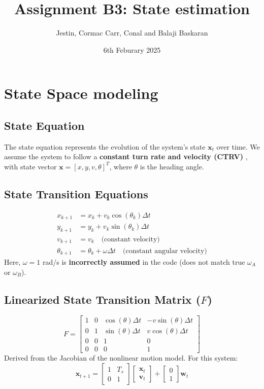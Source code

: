 \documentclass[a4paper,11pt]{article}
\title{Assignment B3: State estimation}
\author{Jestin, Cormac Carr, Conal and Balaji Baskaran}
\date{6th Feburary 2025}
\begin{document}
\maketitle

\section*{State Space modeling}

\subsection*{State Equation}
The state equation represents the evolution of the system's state \( \mathbf{x}_t \) over time. We assume the system to follow a \textbf{ constant turn rate and velocity (CTRV) },  with state vector $\mathbf{x} = [x, y, v, \theta]^T$, where $\theta$ is the heading angle.
\subsection*{State Transition Equations}
\begin{align*}
    x_{k+1} &= x_k + v_k \cos(\theta_k) \Delta t \\
    y_{k+1} &= y_k + v_k \sin(\theta_k) \Delta t \\
    v_{k+1} &= v_k \quad \text{(constant velocity)} \\
    \theta_{k+1} &= \theta_k + \omega \Delta t \quad \text{(constant angular velocity)}
\end{align*}
Here, $\omega = 1$ rad/s is \textbf{incorrectly assumed} in the code (does not match true $\omega_A$ or $\omega_B$).

\subsection*{Linearized State Transition Matrix ($F$)}
\begin{equation*}
    F =
    \begin{bmatrix}
        1 & 0 & \cos(\theta)\Delta t & -v \sin(\theta)\Delta t \\
        0 & 1 & \sin(\theta)\Delta t & v \cos(\theta)\Delta t \\
        0 & 0 & 1 & 0 \\
        0 & 0 & 0 & 1
    \end{bmatrix}
\end{equation*}
Derived from the Jacobian of the nonlinear motion model.
For this system:
\[
\mathbf{x}_{t+1} = 
\begin{bmatrix}
1 & T_s \\
0 & 1
\end{bmatrix} \begin{bmatrix}
   \mathbf{x}_t \\ \mathbf{v}_{t} 
\end{bmatrix}
 +
\begin{bmatrix}
0 \\
1
\end{bmatrix}
\mathbf{w}_{t}
\]
\end{document}

